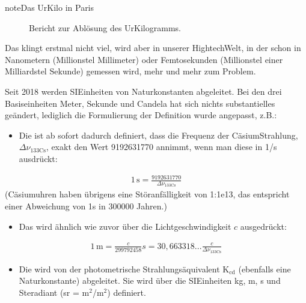 \documentclass[letterpaper,10pt,english]{jupyterBook}
\let\sphinxpxdimen\pdfpxdimen\else\newdimen\sphinxpxdimen
\begin{document}
\begin{sphinxadmonition}{note}{Das Ur\sphinxhyphen{}Kilo in Paris}
\begin{itemize}
\end{itemize}

\begin{figure}[H]
\centering
\capstart

\noindent\sphinxincludegraphics[width=400\sphinxpxdimen]{{ur-kilo}.png}
\caption{Bericht zur Ablösung des Ur\sphinxhyphen{}Kilogramms.}\label{\detokenize{content/1_Messen_Einheit:ur-kilo}}\end{figure}

\sphinxAtStartPar
Das klingt erstmal nicht viel, wird aber in unserer Hightech\sphinxhyphen{}Welt, in der schon in Nanometern (Millionstel Millimeter) oder Femtosekunden (Millionstel einer Milliardstel Sekunde) gemessen wird, mehr und mehr zum Problem.
\end{sphinxadmonition}

\sphinxAtStartPar
Seit 2018 werden  SI\sphinxhyphen{}Einheiten von Naturkonstanten abgeleitet. Bei den drei Basiseinheiten Meter, Sekunde und Candela hat sich nichts substantielles geändert, lediglich die Formulierung der Definition wurde angepasst, z.B.:
\begin{itemize}
\item {} 
\sphinxAtStartPar
Die  ist ab sofort dadurch definiert, dass die Frequenz der Cäsium\sphinxhyphen{}Strahlung, \(\Delta \nu_\mathrm{133Cs}\), exakt den Wert 9192631770 annimmt, wenn man diese in 1/s ausdrückt:

\end{itemize}
\begin{equation*}
\begin{split}1\,\mathrm s = \frac{9192631770}{\Delta \nu_\mathrm{133Cs}}\end{split}
\end{equation*}
\sphinxAtStartPar
(Cäsiumuhren haben übrigens eine Störanfälligkeit von 1:1e13, das entspricht einer Abweichung von 1s in 300000 Jahren.)
\begin{itemize}
\item {} 
\sphinxAtStartPar
Das  wird ähnlich wie zuvor über die Lichtgeschwindigkeit \(c\) ausgedrückt:

\end{itemize}
\begin{equation*}
\begin{split}1\,\mathrm m = \frac{c}{299 792 458} s = 30,663318...\frac{c}{\Delta \nu_\mathrm{133Cs}}\end{split}
\end{equation*}\begin{itemize}
\item {} 
\sphinxAtStartPar
Die  wird von der photometrische Strahlungsäquivalent \(\mathrm K_\mathrm{cd}\) (ebenfalls eine Naturkonstante) abgeleitet. Sie wird über die SI\sphinxhyphen{}Einheiten kg, m, s und Steradiant (sr = m\(^2\)/m\(^2\)) definiert.

\end{itemize}
\end{document}
